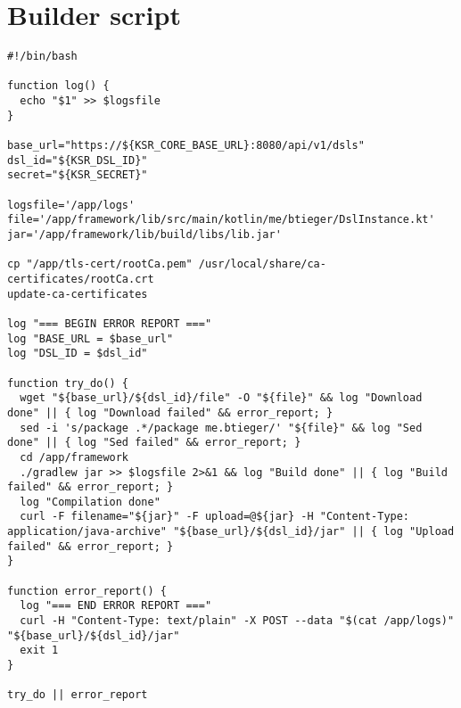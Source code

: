 \clearpage\section{Builder script}

\begin{lstlisting}[caption={Builder script},language=mybash,label=appendix:builder]
#!/bin/bash

function log() {
  echo "$1" >> $logsfile
}

base_url="https://${KSR_CORE_BASE_URL}:8080/api/v1/dsls"
dsl_id="${KSR_DSL_ID}"
secret="${KSR_SECRET}"

logsfile='/app/logs'
file='/app/framework/lib/src/main/kotlin/me/btieger/DslInstance.kt'
jar='/app/framework/lib/build/libs/lib.jar'

cp "/app/tls-cert/rootCa.pem" /usr/local/share/ca-certificates/rootCa.crt
update-ca-certificates

log "=== BEGIN ERROR REPORT ==="
log "BASE_URL = $base_url"
log "DSL_ID = $dsl_id"

function try_do() {
  wget "${base_url}/${dsl_id}/file" -O "${file}" && log "Download done" || { log "Download failed" && error_report; }
  sed -i 's/package .*/package me.btieger/' "${file}" && log "Sed done" || { log "Sed failed" && error_report; }
  cd /app/framework
  ./gradlew jar >> $logsfile 2>&1 && log "Build done" || { log "Build failed" && error_report; }
  log "Compilation done"
  curl -F filename="${jar}" -F upload=@${jar} -H "Content-Type: application/java-archive" "${base_url}/${dsl_id}/jar" || { log "Upload failed" && error_report; }
}

function error_report() {
  log "=== END ERROR REPORT ==="
  curl -H "Content-Type: text/plain" -X POST --data "$(cat /app/logs)" "${base_url}/${dsl_id}/jar"
  exit 1
}

try_do || error_report
\end{lstlisting}
